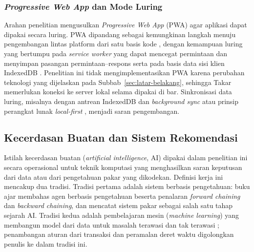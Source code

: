 \subsubsection{\texorpdfstring{\textit{Progressive Web App}}{Progressive Web App} dan Mode Luring}
\label{subsubsec:pwa}

Arahan penelitian mengusulkan \textit{Progressive Web App} (PWA) agar aplikasi dapat dipakai secara luring. PWA dipandang sebagai kemungkinan langkah menuju pengembangan lintas platform dari satu basis kode \citep*{majchrzak2018progressive}, dengan kemampuan luring yang bertumpu pada \textit{service worker} yang dapat mencegat permintaan dan menyimpan pasangan permintaan--respons \citep*{chintala2026service} serta pada basis data sisi klien IndexedDB \citep*{becker2025indexed}. Penelitian ini tidak mengimplementasikan PWA karena perubahan teknologi yang dijelaskan pada Subbab~\ref{sec:latar-belakang}, sehingga Takar memerlukan koneksi ke server lokal selama dipakai di bar. Sinkronisasi data luring, misalnya dengan antrean IndexedDB dan \textit{background sync} \citep*{nugraha2026implementation} atau prinsip perangkat lunak \textit{local-first} \citep*{kleppmann2019localfirst}, menjadi saran pengembangan.

\subsection{Kecerdasan Buatan dan Sistem Rekomendasi}
\label{subsec:kecerdasan-buatan}

Istilah kecerdasan buatan (\textit{artificial intelligence}, AI) dipakai dalam penelitian ini secara operasional untuk teknik komputasi yang menghasilkan saran keputusan dari data atau dari pengetahuan pakar yang dikodekan. Definisi kerja ini mencakup dua tradisi. Tradisi pertama adalah sistem berbasis pengetahuan: buku ajar \citet*{russell2021artificial} membahas agen berbasis pengetahuan beserta penalaran \textit{forward chaining} dan \textit{backward chaining}, dan mencatat sistem pakar sebagai salah satu tahap sejarah AI. Tradisi kedua adalah pembelajaran mesin (\textit{machine learning}) yang membangun model dari data untuk masalah terawasi dan tak terawasi \citep{pedregosa2011scikitlearn}; penambangan aturan dari transaksi dan peramalan deret waktu digolongkan penulis ke dalam tradisi ini.

